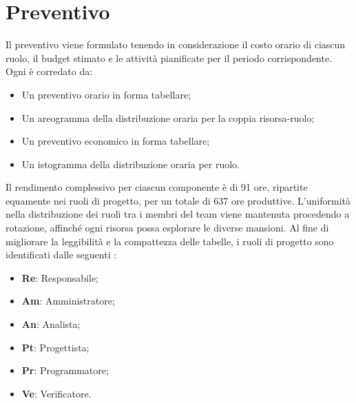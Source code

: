 \section{Preventivo}
\par Il preventivo viene formulato tenendo in considerazione il costo orario di ciascun ruolo, il budget stimato e le attività pianificate per il periodo corrispondente. Ogni  è corredato da:
\begin{itemize}
    \item Un preventivo orario in forma tabellare;
    \item Un areogramma della distribuzione oraria per la coppia risorsa-ruolo;
    \item Un preventivo economico in forma tabellare;
    \item Un istogramma della distribuzione oraria per ruolo.
\end{itemize}

\vspace{0.5\baselineskip}
\par Il rendimento complessivo per ciascun componente è di 91 ore, ripartite equamente nei ruoli di progetto, per un totale di 637 ore produttive. L'uniformità nella distribuzione dei ruoli tra i membri del team viene mantenuta procedendo a rotazione, affinché ogni risorsa possa esplorare le diverse mansioni. Al fine di migliorare la leggibilità e la compattezza delle tabelle, i ruoli di progetto sono identificati dalle seguenti : 
\begin{itemize}
    \item \textbf{Re}: Responsabile;
    \item \textbf{Am}: Amministratore;
    \item \textbf{An}: Analista;
    \item \textbf{Pt}: Progettista;
    \item \textbf{Pr}: Programmatore;
    \item \textbf{Ve}: Verificatore.
\end{itemize}

